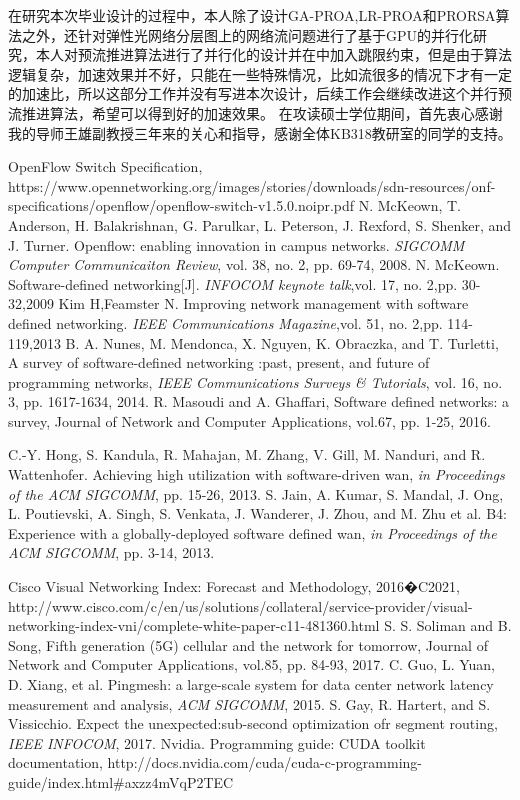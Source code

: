 \documentclass[master]{thesis-uestc}
\begin{document}
在研究本次毕业设计的过程中，本人除了设计GA-PROA,LR-PROA和PRORSA算法之外，还针对弹性光网络分层图上的网络流问题进行了基于GPU的并行化研究，本人对预流推进算法进行了并行化的设计并在中加入跳限约束，但是由于算法逻辑复杂，加速效果并不好，只能在一些特殊情况，比如流很多的情况下才有一定的加速比，所以这部分工作并没有写进本次设计，后续工作会继续改进这个并行预流推进算法，希望可以得到好的加速效果。
\thesisacknowledgement
在攻读硕士学位期间，首先衷心感谢我的导师王雄副教授三年来的关心和指导，感谢全体KB318教研室的同学的支持。



\begin{thebibliography}{1}
OpenFlow Switch Specification, https://www.opennetworking.org/images\newline/stories/downloads/sdn-resources/onf-specifications/openflow/openflow-switch-v1.5.0.noipr.pdf
N. McKeown, T. Anderson, H. Balakrishnan, G. Parulkar, L. Peterson, J. Rexford, S. Shenker, and J. Turner. Openflow: enabling innovation in campus networks. \emph{SIGCOMM Computer Communicaiton Review}, vol. 38, no. 2, pp. 69-74, 2008.
N. McKeown. Software-defined networking[J]. \emph{INFOCOM keynote talk},vol. 17, no. 2,pp. 30-32,2009
Kim H,Feamster N. Improving network management with software defined networking. \emph{IEEE Communications Magazine},vol. 51, no. 2,pp. 114-119,2013
B. A. Nunes, M. Mendonca, X. Nguyen, K. Obraczka, and T. Turletti,  A survey of software-defined networking :past, present, and future of programming networks, \emph{IEEE Communications Surveys \& Tutorials}, vol. 16, no. 3, pp. 1617-1634, 2014.
R. Masoudi and A. Ghaffari, Software defined networks: a survey, Journal of Network and Computer Applications, vol.67, pp. 1-25, 2016.


C.-Y. Hong, S. Kandula, R. Mahajan, M. Zhang, V. Gill, M. Nanduri, and R. Wattenhofer. Achieving high utilization with software-driven wan, \emph{in Proceedings of the ACM SIGCOMM}, pp. 15-26, 2013.
S. Jain, A. Kumar, S. Mandal, J. Ong, L. Poutievski, A. Singh, S. Venkata, J. Wanderer, J. Zhou, and M. Zhu et al. B4: Experience with a globally-deployed software defined wan, \emph{in Proceedings of the ACM SIGCOMM}, pp. 3-14, 2013.

Cisco Visual Networking Index: Forecast and Methodology, 2016�C2021, http://www.cisco.com/c/en/us/solutions/collateral/service-provider/visual-networking-index-vni/complete-white-paper-c11-481360.html
S. S. Soliman and B. Song, Fifth generation (5G) cellular and the network for tomorrow, Journal of Network and Computer Applications, vol.85, pp. 84-93, 2017.
C. Guo, L. Yuan, D. Xiang, et al. Pingmesh: a large-scale system for data center network latency measurement and analysis, \emph{ACM SIGCOMM}, 2015.
S. Gay, R. Hartert, and S. Vissicchio. Expect the unexpected:sub-second optimization ofr segment routing, \emph{IEEE INFOCOM}, 2017.
Nvidia. Programming guide: CUDA toolkit documentation, http://docs.nvidia.com/cuda/cuda-c-programming-guide/index.html\#axzz4mVqP2TEC


\end{thebibliography}
\end{document}
